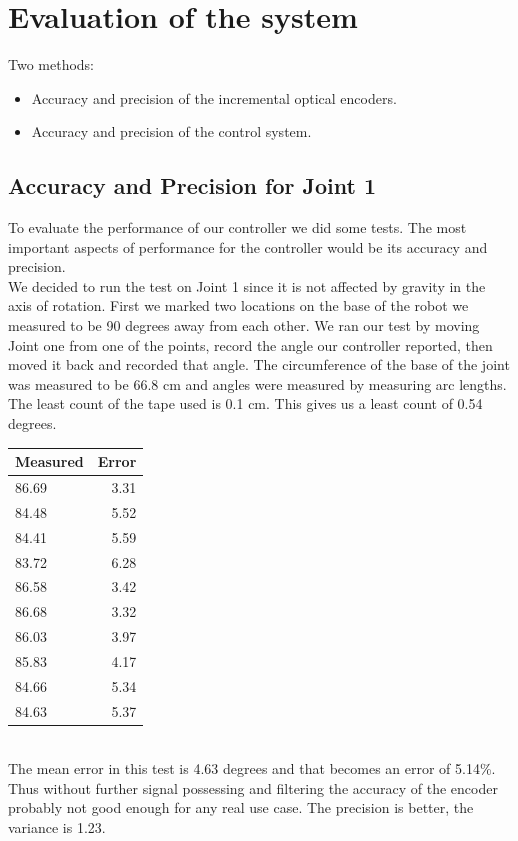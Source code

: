 \documentclass[10pt,a4paper]{article}
\begin{document}
\section{Evaluation of the system}
Two methods:
\begin{itemize}
\item Accuracy and precision of the incremental optical encoders.
\item Accuracy and precision of the control system.
\end{itemize}

\subsection{Accuracy and Precision for Joint 1}
To evaluate the performance of our controller we did some tests. The most important aspects of performance for the controller would be its accuracy and precision. \\

We decided to run the test on Joint 1 since it is not affected by gravity in the axis of rotation. First we marked two locations on the base of the robot we measured to be 90 degrees away from each other.  We ran our test by moving Joint one from one of the points, record the angle our controller reported, then moved it back and recorded that angle. The circumference of the base of the joint was measured to be 66.8 cm and angles were measured by measuring arc lengths. The least count of the tape used is 0.1 cm. This gives us a least count of 0.54 degrees.\\

\begin{tabular}{ | l | r |}
\hline
\textbf{Measured} & \textbf{Error} \\
\hline
 86.69 & 3.31 \\
\hline
 84.48 & 5.52 \\
\hline
 84.41 & 5.59 \\
\hline
 83.72 & 6.28 \\
\hline
 86.58 & 3.42\\
\hline
 86.68 & 3.32\\
\hline
86.03 & 3.97\\
\hline
85.83 & 4.17\\
\hline
84.66 & 5.34\\
\hline
84.63 & 5.37\\
\hline
\end{tabular} \\ 

The mean error in this test is 4.63 degrees and that becomes an error of 5.14\%. Thus without further signal possessing and filtering the accuracy of the encoder probably not good enough for any real use case. The precision is better, the variance is 1.23.\\
\end{document}
